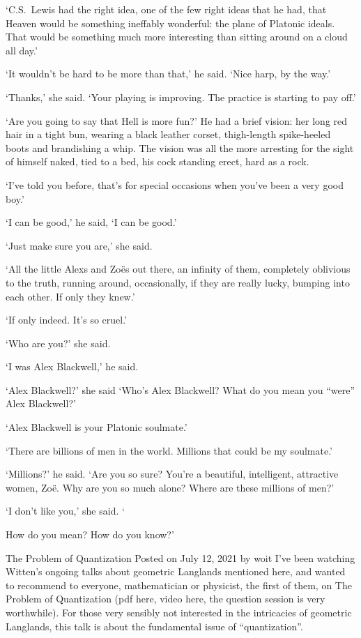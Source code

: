 `C.S.~Lewis had the right idea, one of the few right ideas that he
had, that Heaven would be something ineffably wonderful: the plane
of Platonic ideals. That would be something much more interesting than sitting around on a
cloud all day.'

`It wouldn't be hard to be more than that,' he said. `Nice harp, by the
way.'

`Thanks,' she said. `Your playing is improving. The practice is
starting to pay off.'

`Are you going to say that Hell is more fun?' He had a brief
vision: her long red hair in a tight bun, wearing a black
leather corset, thigh-length spike-heeled boots and brandishing a
whip. The vision was all the more arresting for the sight of himself
naked, tied to a bed, his cock standing erect, hard as a rock.

`I've told you before, that's for special occasions when you've been a {\twelveit very\/} good boy.'

`I can be good,' he said, `I can be good.'

`Just make sure you are,' she said.

`All the little Alexs and Zoës out there, an infinity of them,
completely oblivious to the truth, running around, occasionally, if
they are really lucky, bumping into each other. If only they knew.'

`If only indeed. It's so cruel.'

\majorbreak
`Who are you?' she said.

`I was Alex Blackwell,' he said.

`Alex Blackwell?' she said `Who's Alex Blackwell? What do you mean you
``were'' Alex Blackwell?'

`Alex Blackwell is your Platonic soulmate.'

`There are billions of men in the world. Millions that
could be my soulmate.'

`Millions?' he said. `Are you so sure? You're a beautiful, intelligent,
attractive women, Zoë. Why are you so much alone? Where are
these millions of men?'

`I don't like you,' she said. `

 How do you mean? How do you know?'

\majorbreak
The Problem of Quantization
Posted on July 12, 2021 by woit
I’ve been watching Witten’s ongoing talks about geometric Langlands mentioned here, and wanted to recommend to everyone, mathematician or physicist, the first of them, on The Problem of Quantization (pdf here, video here, the question session is very worthwhile). For those very sensibly not interested in the intricacies of geometric Langlands, this talk is about the fundamental issue of “quantization”.

